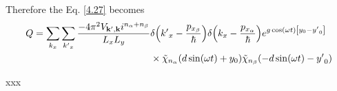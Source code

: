 Therefore the Eq. \eqref{4.27} becomes
\begin{equation} \label{4.38}
  \begin{aligned}
    Q =
    \sum_{k_x}\sum_{{k'}_x}
    \frac{-4\pi^2 V_{\mathbf{k'},\mathbf{k}} i^{n_{\alpha} + n_{\beta}}}{L_x L_y} &
    \delta\qty({k'}_x -\frac{p_{x_{\beta}}}{\hbar})
    \delta\qty(k_x -\frac{p_{x_{\alpha}}}{\hbar})
    e^{g\cos(\omega t)\qty[y_0 - {y'}_0]}\\
    & \times
    \tilde{\chi}_{n_{\alpha}}\qty(d\sin(\omega t) + y_0)
    \tilde{\chi}_{n_{\beta}}\qty(-d\sin(\omega t) - {y'}_0)
  \end{aligned}
\end{equation}



















xxx
